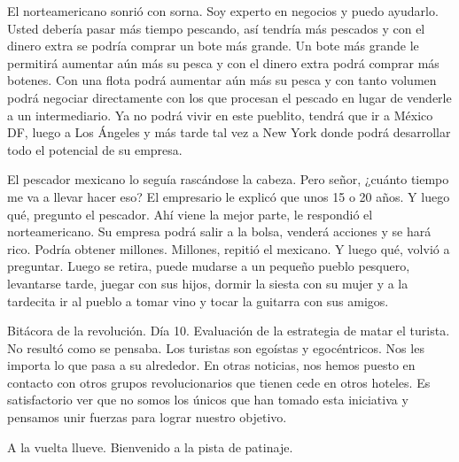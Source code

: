 \documentclass[12pt,twoside,openright,a5paper]{book}
\begin{document}
El norteamericano sonrió con sorna. Soy experto en negocios y puedo
ayudarlo. Usted debería pasar más tiempo pescando, así tendría más
pescados y con el dinero extra se podría comprar un bote más grande. Un
bote más grande le permitirá aumentar aún más su pesca y con el dinero
extra podrá comprar más botenes. Con una flota podrá aumentar aún más su
pesca y con tanto volumen podrá negociar directamente con los que procesan
el pescado en lugar de venderle a un intermediario. Ya no podrá vivir en
este pueblito, tendrá que ir a México DF, luego a Los Ángeles y más tarde
tal vez a New York donde podrá desarrollar todo el potencial de su empresa.

El pescador mexicano lo seguía rascándose la cabeza. Pero señor, ¿cuánto
tiempo me va a llevar hacer eso? El empresario le explicó que unos 15 o
20 años. Y luego qué, pregunto el pescador. Ahí viene la mejor parte,
le respondió el norteamericano. Su empresa podrá salir a la bolsa,
venderá acciones y se hará rico. Podría obtener millones. Millones,
repitió el mexicano. Y luego qué, volvió a preguntar. Luego se retira,
puede mudarse a un pequeño pueblo pesquero, levantarse tarde, juegar con
sus hijos, dormir la siesta con su mujer y a la tardecita ir al pueblo a
tomar vino y tocar la guitarra con sus amigos.


\vspace{0.5cm}
\hrulefill\hspace{0.2cm} \decofourleft\decofourright \hspace{0.2cm} \hrulefill
\vspace{0.5cm}

Bitácora de la revolución. Día 10. Evaluación de la estrategia de
matar el turista. No resultó como se pensaba. Los turistas son egoístas y
egocéntricos. Nos les importa lo que pasa a su alrededor. En otras noticias,
nos hemos puesto en contacto con otros grupos revolucionarios que tienen
cede en otros hoteles. Es satisfactorio ver que no somos los únicos que han
tomado esta iniciativa y pensamos unir fuerzas para lograr nuestro objetivo.



\vspace{0.5cm}
\hrulefill\hspace{0.2cm} \decofourleft\decofourright \hspace{0.2cm} \hrulefill
\vspace{0.5cm}

A la vuelta llueve. Bienvenido a la pista de patinaje.
\end{document}
